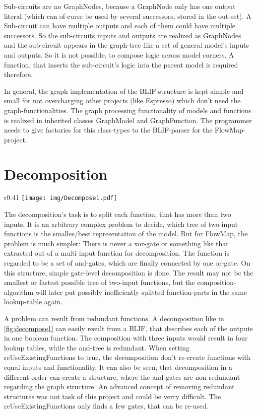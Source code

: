 \documentclass[colorback,accentcolor=tud1c,11pt]{tudreport}
\begin{document}
Sub-circuits are no GraphNodes, because a GraphNode only has one output literal (which can of-curse be used by several successors, stored in the out-set). A Sub-circuit can have multiple outputs and each of them could have multiple successors. So the sub-circuits inputs and outputs are realized as GraphNodes and the sub-circuit appears in the graph-tree like a set of general model's inputs and outputs. So it is not possible, to compose logic across model corners. A function, that inserts the sub-circuit's logic into the parent model is required therefore.

In general, the graph implementation of the BLIF-structure is kept simple and small for not overcharging other projects (like Espresso) which don't need the graph-functionalities. The graph processing functionality of models and functions is realized in inherited classes GraphModel and GraphFunction. The programmer needs to give factories for this class-types to the BLIF-parser for the FlowMap-project.



\chapter{Decomposition}
\label{decomposition}
\begin{wrapfigure}{r}{0.41\textwidth}
\centering
\texttt{[image: img/Decompose1.pdf]}\\
\caption{Example of redundant decomposition}
\label{fig:decompose1}
\end{wrapfigure}
The decomposition's task is to split each function, that has more than two inputs. It is an arbitrary complex problem to decide, which tree of two-input functions is the smalles/best representation of the model. But for FlowMap, the problem is much simpler: There is never a xor-gate or something like that extracted out of a multi-input function for decomposition. The function is regarded to be a set of and-gates, which are finally connected by one or-gate. On this structure, simple gate-level decomposition is done. The result may not be the smallest or fastest possible tree of two-input functions, but the composition-algorithm will later put possibly inefficiently splitted function-parts in the same lookup-table again.

A problem can result from redundant functions. A decomposition like in \ref{fig:decompose1} can easily result from a BLIF, that describes each of the outputs in one boolean function. The composition with three inputs would result in four lookup tables, while the and-tree is redundant. When setting reUseExistingFunctions to true, the decomposition don't re-create functions with equal inputs and functionality. It can also be seen, that decomposition in a different order can create a structure, where the and-gates are non-redundant regarding the graph structure. An advanced concept of removing redundant structures was not task of this project and could be verry difficult. The reUseExistingFunctions only finds a few gates, that can be re-used.
\end{document}

